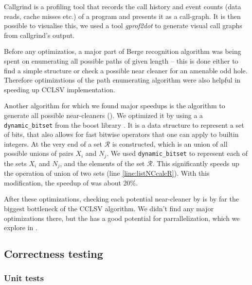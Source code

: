 
Callgrind is a profiling tool that records the call history and event counts (data reads, cache misses etc.) of a program and presents it as a call-graph. It is then possible to visualise this, we used a tool \emph{gprof2dot} \cite{gprof2dot} to generate visual call graphs from callgrind's output.

Before any optimizatios, a major part of Berge recognition algorithm was being spent on enumerating all possible paths of given length -- this is done either to find a simple structure or check a possible near cleaner for an amenable odd hole. Therefore optimizations of the path enumerating algorithm were also helpful in speeding up CCLSV implementation.


Another algorithm for which we found major speedups is the algorithm to generate all possible near-cleaners (). We optimized it by using a a \texttt{dynamic\_bitset} from the boost library \cite{boost}. It is a data structure to represent a set of bits, that also allows for fast bitwise operators that one can apply to builtin integers. At the very end of  a set $\mathcal{R}$ is constructed, which is an union of all possible unions of pairs $X_i$ and $N_j$. We used \texttt{dynamic\_bitset} to represent each of the sets $X_i$ and $N_j$, and the elements of the set $\mathcal{R}$. This significantly speeds up the operation of union of two sets (line \ref{line:listNCcalcR}). With this modification, the speedup of  was about 20\%.

After these optimizations, checking each potential near-cleaner by  is by far the biggest bottleneck of the CCLSV algorithm. We didn't find any major optimizations there, but the  has a good potential for parrallelization, which we explore in .

\subsection{Correctness testing}

\subsubsection{Unit tests}

